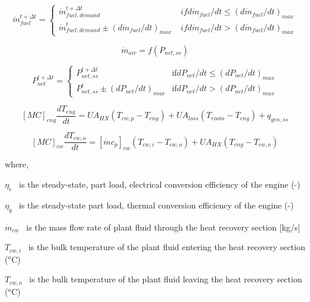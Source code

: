 \begin{equation}
\dot m_{fuel}^{t+\Delta t} = \left\{
    \begin{array}{cl}
      \dot m_{fuel,demand}^{t+\Delta t}       &\; if d\dot m_{fuel} / dt \le (d\dot m_{fuel}/dt)_{max} \\
      \dot m_{fuel,demand}^t \pm (d\dot m_{fuel}/dt)_{max}      &\; if d\dot m_{fuel} / dt > (d\dot m_{fuel}/dt)_{max} 
    \end{array}
  \right.
\end{equation}

\begin{equation}
{\dot m_{air}} = f({P_{net,ss}})
\end{equation}

\begin{equation}
P_{net}^{t+\Delta t} = \left\{
    \begin{array}{cl}
      P_{net,ss}^{t+\Delta t}                   & \text{if} dP_{net} / dt \le (dP_{net}/dt)_{max} \\
      P_{net,ss}^t \pm (dP_{net}/dt)_{max}      & \text{if} dP_{net} / dt > (dP_{net}/dt)_{max} 
    \end{array}
  \right.
\end{equation}

\begin{equation}
{[MC]_{eng}}\frac{{d{T_{eng}}}}{{dt}} = U{A_{HX}}\left( {{T_{cw,p}} - {T_{eng}}} \right) + U{A_{loss}}\left( {{T_{room}} - {T_{eng}}} \right) + {q_{gen,ss}}
\end{equation}

\begin{equation}
{[MC]_{cw}}\frac{{d{T_{cw,o}}}}{{dt}} = {[\dot m{c_p}]_{cw}}\left( {{T_{cw,i}} - {T_{cw,o}}} \right) + U{A_{HX}}\left( {{T_{eng}} - {T_{cw,o}}} \right)
\end{equation}

where,

\({\eta_e}\) ~is the steady-state, part load, electrical conversion efficiency of the engine (-)

\({\eta_q}\) ~is the steady-state part load, thermal conversion efficiency of the engine (-)

\({\dot m_{cw}}\) ~is the mass flow rate of plant fluid through the heat recovery section {[}kg/s{]}

\({T_{cw,i}}\) ~is the bulk temperature of the plant fluid entering the heat recovery section (\(^{o}\)C)

\({T_{cw,o}}\) ~is the bulk temperature of the plant fluid leaving the heat recovery section (\(^{o}\)C)

